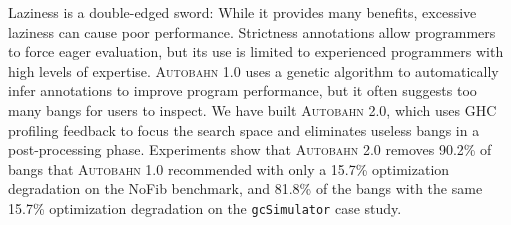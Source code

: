 \documentclass[format=sigplan, review=true, 9pt]{acmart}
\newcommand{\useless}[0]{useless}
\newcommand{\Ao}[0]{\textsc{Autobahn 1.0}}
\newcommand{\At}[0]{\textsc{Autobahn 2.0}}
\begin{document}
Laziness is a double-edged sword: While it provides many benefits,
excessive laziness can cause poor performance. Strictness annotations
allow programmers to force eager evaluation, but its use is limited to
experienced programmers with high levels of expertise. \Ao{} uses a
genetic algorithm to automatically infer annotations to improve
program performance, but it often suggests too many bangs for users to
inspect. We have built \At{}, which uses GHC profiling feedback to
focus the search space and eliminates \useless{} bangs in a
post-processing phase.  Experiments show
that \At{} removes 90.2\% of bangs that \Ao{} recommended with only a
15.7\% optimization degradation on the NoFib benchmark, 
and 81.8\% of the bangs with the same 15.7\% optimization degradation 
on the \texttt{gcSimulator} case study.



\end{document}
